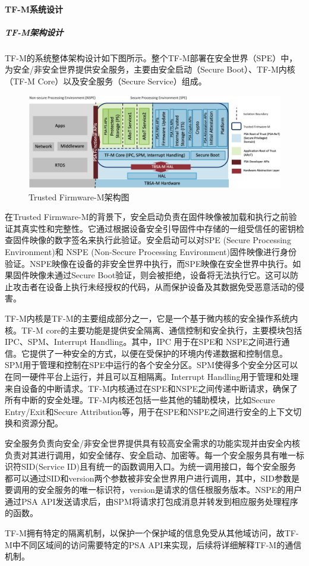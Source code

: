 \documentclass[12pt,a4paper]{ctexart}
\numberwithin{figure}{section}
\begin{document}
\paragraph{TF-M系统设计}
\subparagraph{TF-M架构设计}
\par TF-M的系统整体架构设计如下图所示。整个TF-M部署在安全世界（SPE）中，为安全/非安全世界提供安全服务，主要由安全启动（Secure Boot）、TF-M内核（TF-M Core）以及安全服务（Secure Service）组成。
\begin{figure}
    \centering
    \includegraphics[scale=0.2]{graph/readme_tfm_v8.png}
    \caption{Trusted Firmware-M架构图}
\end{figure}
\par 在Trusted Firmware-M的背景下，安全启动负责在固件映像被加载和执行之前验证其真实性和完整性。它通过根据设备安全引导固件中存储的一组受信任的密钥检查固件映像的数字签名来执行此验证。安全启动可以对SPE (Secure Processing Environment)和 NSPE (Non-Secure Processing Environment)固件映像进行身份验证。NSPE映像在设备的非安全世界中执行，而SPE映像在安全世界中执行。如果固件映像未通过Secure Boot验证，则会被拒绝，设备将无法执行它。这可以防止攻击者在设备上执行未经授权的代码，从而保护设备及其数据免受恶意活动的侵害。
\par TF-M内核是TF-M的主要组成部分之一，它是一个基于微内核的安全操作系统内核。TF-M core的主要功能是提供安全隔离、通信控制和安全执行，主要模块包括IPC、SPM、Interrupt Handling。其中，IPC 用于在SPE和 NSPE之间进行通信。它提供了一种安全的方式，以便在受保护的环境内传递数据和控制信息。SPM用于管理和控制在SPE中运行的各个安全分区。SPM使得多个安全分区可以在同一硬件平台上运行，并且可以互相隔离。Interrupt Handling用于管理和处理来自设备的中断请求。TF-M内核通过在SPE和NSPE之间传递中断请求，确保了所有中断的安全处理。TF-M内核还包括一些其他的辅助模块，比如Secure Entry/Exit和Secure Attribution等，用于在SPE和NSPE之间进行安全的上下文切换和资源分配。
\par 安全服务负责向安全/非安全世界提供具有较高安全需求的功能实现并由安全内核负责对其进行调用，如安全储存、安全启动、加密等。每一个安全服务具有唯一标识符SID(Service ID)且有统一的函数调用入口。为统一调用接口，每个安全服务都可以通过SID和version两个参数被非安全世界用户进行调用，其中，SID参数是要调用的安全服务的唯一标识符，version是请求的信任根服务版本。NSPE的用户通过PSA API发送请求后，由SPM将请求打包成消息并转发到相应服务处理程序的函数。
\par TF-M拥有特定的隔离机制，以保护一个保护域的信息免受从其他域访问，故TF-M中不同区域间的访问需要特定的PSA API来实现，后续将详细解释TF-M的通信机制。
\end{document}
